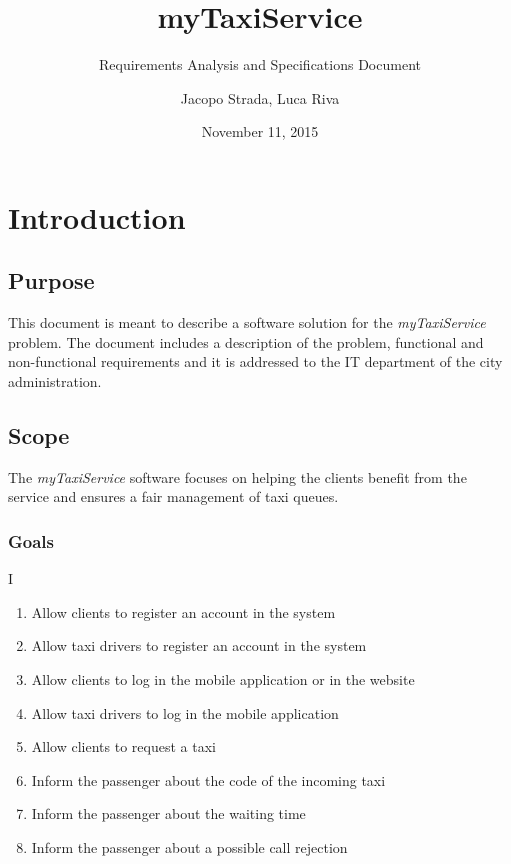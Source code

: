 \documentclass[9pt]{beamer}
\title{myTaxiService}
\subtitle{Requirements Analysis and Specifications Document}
\author{Jacopo Strada, Luca Riva}
\date{November 11, 2015}
\makeatletter
\newcommand*{\currentname}{\@currentlabelname}
\newcounter{saveenumi}
\newcommand{\seti}{\setcounter{saveenumi}{\value{enumi}}}
\makeatother
\begin{document}
\maketitle

\section{Introduction}
\subsection{Purpose}
\begin{frame}{\currentname}
This document is meant to describe a software solution for the \emph{myTaxiService} problem. The document includes a description of the problem, functional and non-functional requirements and it is addressed to the IT department of the city administration.
\end{frame}

\subsection{Scope}
\begin{frame}{\currentname}
The \emph{myTaxiService} software focuses on helping the clients benefit from the service and ensures a fair management of taxi queues.
\end{frame}

\subsubsection{Goals}
\begin{frame}{\currentname{} I}

\begin{enumerate}[label=\bfseries G\arabic*:]
\item Allow clients to register an account in the system
\item Allow taxi drivers to register an account in the system
\item Allow clients to log in the mobile application or in the website
\item Allow taxi drivers to log in the mobile application
\item Allow clients to request a taxi
\item Inform the passenger about the code of the incoming taxi
\item Inform the passenger about the waiting time
\item Inform the passenger about a possible call rejection
\seti
\end{enumerate}
\end{frame}
\end{document}
